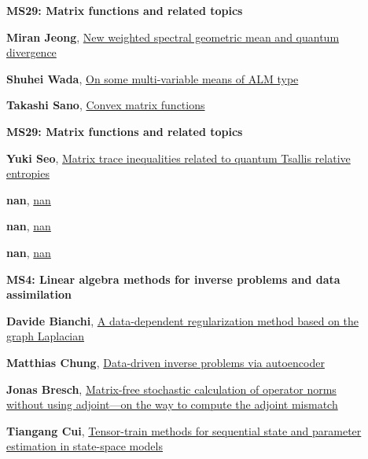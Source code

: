 \documentclass[ILAS2025-program.tex]{subfiles}
\begin{document}
        \begin{description}
    \item[] {\color{mstitle}\textbf{MS29: Matrix functions and related topics}} 
    \item[] \hypertarget{up0123}{}\textbf{Miran Jeong}, \hyperlink{down0123}{New weighted spectral geometric mean and quantum divergence}
        \item[] \hypertarget{up0124}{}\textbf{Shuhei Wada}, \hyperlink{down0124}{On some multi-variable means of ALM type}
        \item[] \hypertarget{up0125}{}\textbf{Takashi Sano}, \hyperlink{down0125}{Convex matrix functions}
        \end{description}
    \begin{description}
    \item[] {\color{mstitle}\textbf{MS29: Matrix functions and related topics}} 
    \item[] \hypertarget{up0157}{}\textbf{Yuki Seo}, \hyperlink{down0157}{Matrix trace inequalities related to quantum Tsallis relative entropies
}
        \item[] \hypertarget{up0158}{}\textbf{nan}, \hyperlink{down0158}{nan}
        \item[] \hypertarget{up0159}{}\textbf{nan}, \hyperlink{down0159}{nan}
        \item[] \hypertarget{up0160}{}\textbf{nan}, \hyperlink{down0160}{nan}
        \end{description}
    \begin{description}
    \item[] {\color{mstitle}\textbf{MS4: Linear algebra methods for inverse problems and data assimilation}} 
    \item[] \hypertarget{up0201}{}\textbf{Davide Bianchi}, \hyperlink{down0201}{A data-dependent regularization method based on the graph Laplacian}
        \item[] \hypertarget{up0202}{}\textbf{Matthias Chung}, \hyperlink{down0202}{Data-driven inverse problems via autoencoder
}
        \item[] \hypertarget{up0203}{}\textbf{Jonas Bresch}, \hyperlink{down0203}{Matrix-free stochastic calculation of operator norms without using adjoint---on the way to compute the adjoint mismatch}
        \item[] \hypertarget{up0204}{}\textbf{Tiangang Cui}, \hyperlink{down0204}{Tensor-train methods for sequential state and parameter estimation in state-space models
}
        \end{description}
    \newpage
\end{document}
